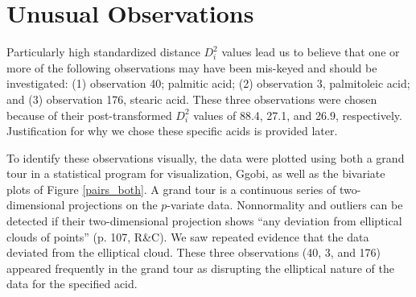 \section{Unusual Observations}


Particularly high standardized distance $D_i^2$ values lead us to believe that one or more of the following observations may have been mis-keyed and should be investigated: (1) observation 40; palmitic acid; (2) observation 3, palmitoleic acid; and (3) observation 176, stearic acid. These three observations were chosen because of their post-transformed $D_i^2$ values of 88.4, 27.1, and 26.9, respectively. Justification for why we chose these specific acids is provided later.

To identify these observations visually, the data were plotted using both a grand tour in a statistical program for visualization, Ggobi, as well as the bivariate plots of Figure \ref{pairs_both}. A grand tour is a continuous series of two-dimensional projections on the $p$-variate data. Nonnormality and outliers can be detected if their two-dimensional projection shows ``any deviation from elliptical clouds of points'' (p. 107, R\&C). We saw repeated evidence that the data deviated from the elliptical cloud. These three observations (40, 3, and 176) appeared frequently in the grand tour as disrupting the elliptical nature of the data for the specified acid.

